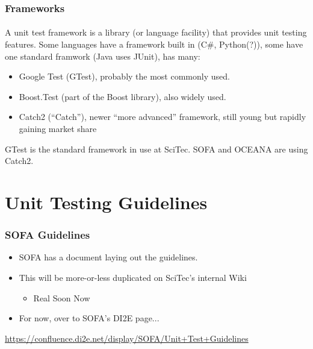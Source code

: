 \begin{frame}[fragile]
\frametitle{Frameworks}
\framesubtitle{}
A unit test framework is a library (or language facility) that
provides unit testing features. Some languages have a framework built
in (C\#, Python(?)), some have one standard framwork (Java uses
JUnit), \CC has many:
\begin{itemize}
\item Google Test (GTest), probably the most commonly used.
\item Boost.Test (part of the Boost library), also widely used.
\item Catch2 (``Catch''), newer ``more advanced'' framework, still
  young but rapidly gaining market share
\end{itemize}
\vskip 6pt
GTest is the standard framework in use at SciTec.  SOFA and OCEANA are using
Catch2.
\vskip 6pt
\begin{center}
\end{center}

\end{frame}


\section{Unit Testing Guidelines}
\begin{frame}[fragile]
\frametitle{SOFA Guidelines}
\begin{itemize}
\item SOFA has a document laying out the guidelines.
\item This will be more-or-less duplicated on SciTec's internal Wiki
\begin{itemize}
  \item Real Soon Now\textsuperscript{\textcopyright}
\end{itemize}
\item For now, over to SOFA's DI2E page...
\end{itemize}
\url{https://confluence.di2e.net/display/SOFA/Unit+Test+Guidelines}
\end{frame}
